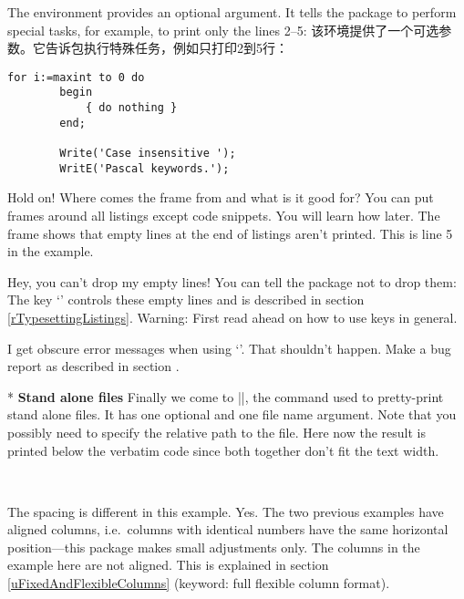 \begin{paracol}{2}
The environment provides an optional argument. It tells the package to
perform special tasks, for example, to print only the lines 2--5:
\switchcolumn
该环境提供了一个可选参数。它告诉包执行特殊任务，例如只打印2到5行：
\begin{lstsample}{\lstset{frame=trbl,framesep=0pt}\label{gFirstKey=ValueList}}{}
        \begin{lstlisting}[firstline=2,
                            lastline=5]
        for i:=maxint to 0 do
        begin
            { do nothing }
        end;

        Write('Case insensitive ');
        WritE('Pascal keywords.');
        \end{lstlisting}
\end{lstsample}
\begin{advise}
\item Hold on! Where comes the frame from and what is it good for?
      \advisespace
      You can put frames around all listings except code snippets.
      You will learn how later. The frame shows that empty lines at the end
      of listings aren't printed. This is line 5 in the example.
\item Hey, you can't drop my empty lines!
      \advisespace
      You can tell the package not to drop them:
      The key `' controls these empty lines and is
      described in section \ref{rTypesettingListings}. Warning: First
      read ahead on how to use keys in general.
\item I get obscure error messages when using `'.
      \advisespace
      That shouldn't happen. Make a bug report as described in section
      .
\end{advise}
\switchcolumn

\switchcolumn[0]*%
\textbf{Stand alone files}
Finally we come to ||, the command used to pretty-print
stand alone files. It has one optional and one file name argument.
Note that you possibly need to specify the relative path to the file.
Here now the result is printed below the verbatim code since both together
don't fit the text width.
\begin{lstsample}{\lstset{comment=[l]\%,columns=fullflexible}}^^A
      {\lstset{alsoletter=\\,emph=\,emphstyle=\rstyle}^^A
      \lstaspectindex{}{}}
   
\end{lstsample}
\begin{advise}
\item The spacing is different in this example.
      \advisespace
      Yes. The two previous examples have aligned columns, i.e.~columns with
      identical numbers have the same horizontal position---this package
      makes small adjustments only. The columns in the example here are not
      aligned. This is explained in section \ref{uFixedAndFlexibleColumns}
      (keyword: full flexible column format).
\end{advise}
\switchcolumn


\end{paracol}
